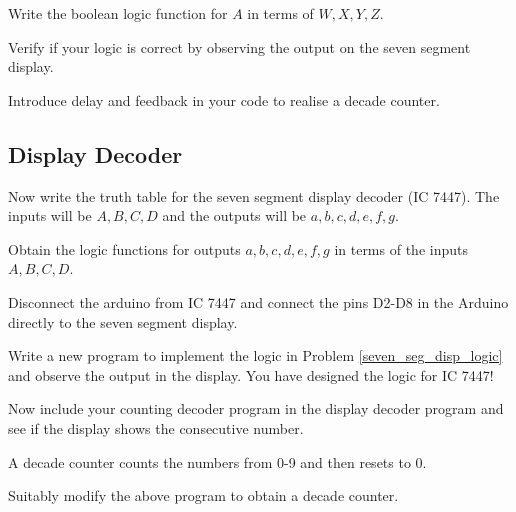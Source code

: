 \begin{problem}
	\label{counter_dec}

Write the boolean logic function for $A$ in terms of $W,X,Y,Z$.
\end{problem}
%

%
\begin{problem}
Verify if your logic is correct by observing the output on the seven segment display.
\end{problem}
%
\begin{problem}
\label{prob:7447_decade}
Introduce delay and feedback in your code to realise a decade counter.
\end{problem}
\subsection{Display Decoder}
%
\begin{problem}
Now write the truth table for the seven segment display decoder (IC 7447).  The inputs will be $A,B,C,D$ and the outputs will be $a,b,c,d,e,f,g$.
\end{problem}
%
\begin{problem}
\label{seven_seg_disp_logic}
Obtain the logic functions for outputs $a,b,c,d,e,f,g$ in terms of the inputs $A,B,C,D$.
\end{problem}
\begin{problem}
Disconnect the arduino from IC 7447 and connect the pins D2-D8 in the Arduino directly to the seven segment display.
\end{problem}
\begin{problem}
Write a new program to implement the logic in Problem \ref{seven_seg_disp_logic} and observe the output in the display.  You have designed the logic for IC 7447!
\end{problem}
\begin{problem}
Now include your counting decoder program in the  display decoder program
and see if the display shows the consecutive number.
\end{problem}
A decade counter counts the numbers from 0-9 and then resets to 0.
\begin{problem}
Suitably modify the above program to obtain a decade counter.
\end{problem}
\setcounter{section}{3}
\setcounter{problem}{3}
\begin{table*}[t]
\centering

\caption{}
\label{fig:ff_ard_pin}
\end{table*}
\setcounter{section}{2}
\setcounter{problem}{2}

